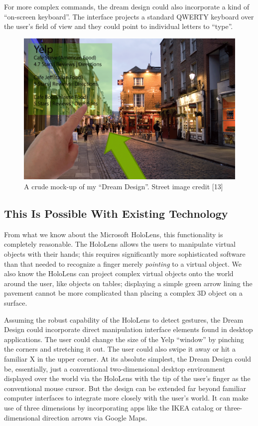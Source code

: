 \documentclass[a4paper,12pt]{article}
\begin{document}
For more complex commands, the dream design could also incorporate a kind of ``on-screen keyboard''. The interface projects a standard QWERTY keyboard over the user's field of view and they could point to individual letters to ``type''. 

\begin{figure}
\centering
\includegraphics[width=\textwidth]{usage}
\caption{A crude mock-up of my ``Dream Design''. Street image credit [13]}
\end{figure}

\subsection{This Is Possible With Existing Technology}

From what we know about the Microsoft HoloLens, this functionality is completely reasonable. The HoloLens allows the users to manipulate virtual objects with their hands; this requires significantly more sophisticated software than that needed to recognize a finger merely \emph{pointing} to a virtual object. We also know the HoloLens can project complex virtual objects onto the world around the user, like objects on tables; displaying a simple green arrow lining the pavement cannot be more complicated than placing a complex 3D object on a surface.

Assuming the robust capability of the HoloLens to detect gestures, the Dream Design could incorporate direct manipulation interface elements found in desktop applications. The user could change the size of the Yelp ``window'' by pinching the corners and stretching it out. The user could also swipe it away or hit a familiar X in the upper corner. At its absolute simplest, the Dream Design could be, essentially, just a conventional two-dimensional desktop environment displayed over the world via the HoloLens with the tip of the user's finger as the conventional mouse cursor. But the design can be extended far beyond familiar computer interfaces to integrate more closely with the user's world. It can make use of three dimensions by incorporating apps like the IKEA catalog or three-dimensional direction arrows via Google Maps. 
\end{document}
